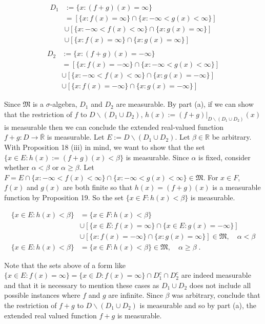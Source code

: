 \documentclass[a4paper]{article}
\begin{document}
\begin{align*}
D_1 &:= \{x : (f+g)(x) = \infty\}\\
&=[\{x : f(x) = \infty\} \cap \{x : -\infty < g(x) < \infty \}]\\
&\cup [\{x : -\infty < f(x) < \infty \} \cap \{x:  g(x) = \infty\}]\\
&\cup [\{x : f(x) = \infty \}\cap \{x : g(x) = \infty\}]\\
\end{align*}
\begin{align*}
D_2 &:= \{x : (f+g)(x) = -\infty\}\\
&=[\{x : f(x) = -\infty\} \cap \{x : -\infty < g(x) < \infty \}]\\
&\cup [\{x : -\infty < f(x) < \infty \} \cap \{x:  g(x) = -\infty\}]\\
&\cup [\{x : f(x) = -\infty \}\cap \{x : g(x) = -\infty\}]
\end{align*}

Since $\mathfrak{M}$ is a $\sigma$-algebra, $D_1$ and $D_2$ are measurable. By part (a), if we can show that the restriction of $f$ to $D\backslash (D_1 \cup D_2)$,  $h(x) := (f+g)\rvert_{D \backslash (D_1 \cup D_2)}(x)$ is measurable then we can conclude the extended real-valued function $f+g : D \rightarrow \overline{\mathbb{R}}$ is measurable. Let $E:=D \backslash (D_1 \cup D_2)$. Let $\beta \in \mathbb{R}$ be arbitrary. With Proposition 18 (iii) in mind, we want to show that the set $\{x \in E : h(x) := (f+g)(x) < \beta\}$ is measurable. Since $\alpha$ is fixed, consider whether $\alpha < \beta$ or $\alpha \geq \beta$. Let $F = E\cap\{x : -\infty < f(x) < \infty\}\cap\{x : -\infty < g(x) < \infty\} \in \mathfrak{M}$. For $x \in F$, $f(x)$ and $g(x)$ are both finite so that $h(x) = (f+g)(x)$ is a measurable function by Proposition 19. So the set $\{x \in F : h(x) < \beta\}$ is measurable.

\begin{align*}
\{x \in E : h(x) < \beta\} &= \{x \in F : h(x) < \beta\}\\ &\cup [\{x \in E : f(x) = \infty\} \cap \{x \in E : g(x) = -\infty\}]\\
&\cup [\{x : f(x) = -\infty\} \cap \{x : g(x) = \infty\}] \in \mathfrak{M}, \quad \alpha < \beta\\
\{x \in E : h(x) < \beta\} &= \{x \in F : h(x) < \beta\} \in \mathfrak{M}, \quad \alpha \geq \beta \;.
\end{align*}

Note that the sets above of a form like $\{x \in E : f(x) = \infty\} = \{x \in D: f(x) = \infty\}\cap D_1^c \cap D_2^c$ are indeed measurable and that it is necessary to mention these cases as $D_1 \cup D_2$ does not include all possible instances where $f$ and $g$ are infinite. Since $\beta$ was arbitrary, conclude that the restriction of $f+g$ to $D\backslash (D_1 \cup D_2)$ is measurable and so by part (a), the extended real valued function $f+g$ is measurable. \\
\end{document}
